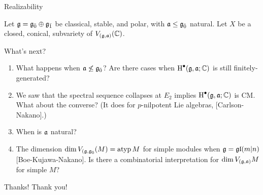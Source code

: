 \documentclass[handout]{beamer}
\begin{document}
\begin{frame}{Realizability}
  \pause
  \begin{theorem}
    Let $\mathfrak{g} = {\mathfrak{g}}_{\bar{0}} \oplus {\mathfrak{g}}_{\bar{1}}$ be classical, stable, and polar, with $\mathfrak{a} \leq {\mathfrak{g}}_{\bar{0}}$ natural. Let $X$ be a closed, conical, subvariety of $V_{(\mathfrak{g},\mathfrak{a})}(\mathbb{C})$. 
  \end{theorem}
\end{frame}

\begin{frame}{What's next?}
  \begin{enumerate}
  \pause\item What happens when $\mathfrak{a} \not\leq {\mathfrak{g}}_{\bar{0}}$? Are there cases when $\operatorname{H}^\bullet(\mathfrak{g},\mathfrak{a};\mathbb{C})$ is still finitely-generated?
  \pause\item We saw that the spectral sequence collapses at $E_2$ implies $\operatorname{H}^\bullet(\mathfrak{g},\mathfrak{a};\mathbb{C})$ is CM. What about the converse? (It does for $p$-nilpotent Lie algebras, [Carlson-Nakano].)
  \pause\item When is $\mathfrak{a}$ natural?
  \pause\item The dimension $\dim V_{(\mathfrak{g},{\mathfrak{g}}_{\bar{0}}}(M) = \operatorname{atyp} M$ for simple modules when $\mathfrak{g} = \mathfrak{gl}(m|n)$ [Boe-Kujawa-Nakano]. Is there a combinatorial interpretation for $\dim V_{(\mathfrak{g},\mathfrak{a})} M$ for simple $M$?
  \end{enumerate}
\end{frame}

\begin{frame}{Thanks!}
  \centering
  \large Thank you!
\end{frame}
\end{document}
